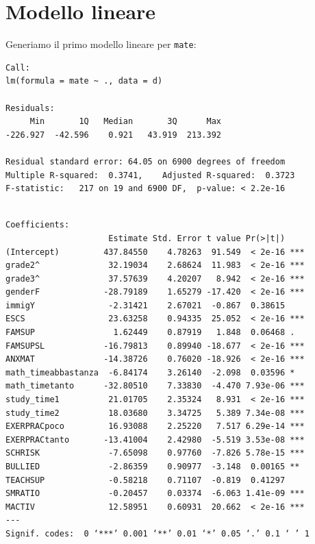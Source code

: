 \documentclass{beamer}
\begin{document}
\section{Modello lineare}

\begin{frame}[fragile]
Generiamo il primo modello lineare per \texttt{mate}:
{\scriptsize
\begin{verbatim}
Call:
lm(formula = mate ~ ., data = d)

Residuals:
     Min       1Q   Median       3Q      Max 
-226.927  -42.596    0.921   43.919  213.392

Residual standard error: 64.05 on 6900 degrees of freedom
Multiple R-squared:  0.3741,	Adjusted R-squared:  0.3723 
F-statistic:   217 on 19 and 6900 DF,  p-value: < 2.2e-16 
\end{verbatim}
}
\end{frame}

\begin{frame}[fragile]

{\tiny
\begin{verbatim}

Coefficients:
                     Estimate Std. Error t value Pr(>|t|)    
(Intercept)         437.84550    4.78263  91.549  < 2e-16 ***
grade2^              32.19034    2.68624  11.983  < 2e-16 ***
grade3^              37.57639    4.20207   8.942  < 2e-16 ***
genderF             -28.79189    1.65279 -17.420  < 2e-16 ***
immigY               -2.31421    2.67021  -0.867  0.38615    
ESCS                 23.63258    0.94335  25.052  < 2e-16 ***
FAMSUP                1.62449    0.87919   1.848  0.06468 .  
FAMSUPSL            -16.79813    0.89940 -18.677  < 2e-16 ***
ANXMAT              -14.38726    0.76020 -18.926  < 2e-16 ***
math_timeabbastanza  -6.84174    3.26140  -2.098  0.03596 *  
math_timetanto      -32.80510    7.33830  -4.470 7.93e-06 ***
study_time1          21.01705    2.35324   8.931  < 2e-16 ***
study_time2          18.03680    3.34725   5.389 7.34e-08 ***
EXERPRACpoco         16.93088    2.25220   7.517 6.29e-14 ***
EXERPRACtanto       -13.41004    2.42980  -5.519 3.53e-08 ***
SCHRISK              -7.65098    0.97760  -7.826 5.78e-15 ***
BULLIED              -2.86359    0.90977  -3.148  0.00165 ** 
TEACHSUP             -0.58218    0.71107  -0.819  0.41297    
SMRATIO              -0.20457    0.03374  -6.063 1.41e-09 ***
MACTIV               12.58951    0.60931  20.662  < 2e-16 ***
---
Signif. codes:  0 ‘***’ 0.001 ‘**’ 0.01 ‘*’ 0.05 ‘.’ 0.1 ‘ ’ 1

\end{verbatim}
}
\end{frame}
\end{document}
